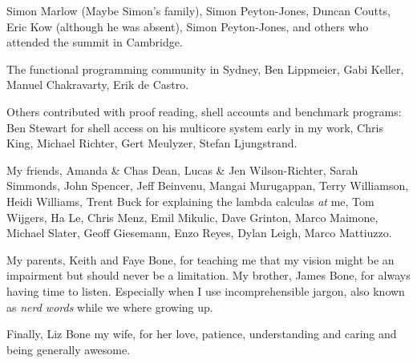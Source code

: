 \documentclass[a4paper,twoside]{report}
\begin{document}
Simon Marlow (Maybe Simon's family),
Simon Peyton-Jones,
Duncan Coutts,
Eric Kow (although he was absent),
Simon Peyton-Jones,
and others who attended the \tscope summit in Cambridge.

The functional programming community in Sydney,
Ben Lippmeier,
Gabi Keller,
Manuel Chakravarty,
Erik de Castro.

Others contributed with proof reading, shell accounts and benchmark
programs:
Ben Stewart for shell access on his multicore system early in my work,
Chris King,
Michael Richter,
Gert Meulyzer,
Stefan Ljungstrand.

My friends,
Amanda \& Chas Dean,
Lucas \& Jen Wilson-Richter,
Sarah Simmonds, John Spencer,
Jeff Beinvenu, Mangai Murugappan,
Terry Williamson, Heidi Williams,
Trent Buck for explaining the lambda calculas \emph{at} me,
Tom Wijgers,
Ha Le,
Chris Menz,
Emil Mikulic,
Dave Grinton,
Marco Maimone,
Michael Slater,
Geoff Giesemann,
Enzo Reyes,
Dylan Leigh,
Marco Mattiuzzo.

My parents, Keith and Faye Bone,
for teaching me that my vision might be an impairment but should never
be a limitation.
My brother, James Bone, for always having time to listen.
Especially when I use incomprehensible jargon,
also known as \emph{nerd words} while we where growing up.

Finally, Liz Bone my wife,
for her love, patience, understanding and caring
and being generally awesome.


\tableofcontents

\listoffigures

\listoftables

\listofalgorithms











\end{document}
